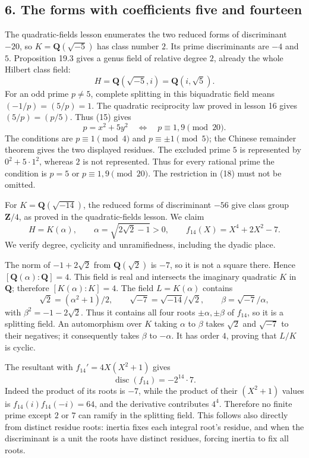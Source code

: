 \documentclass[11pt,a4paper]{article}
\begin{document}
\subsection{6. The forms with coefficients five and
fourteen}\label{the-forms-with-coefficients-five-and-fourteen}

The quadratic-fields lesson enumerates the two reduced forms of
discriminant \(-20\), so \(K=\mathbf Q(\sqrt{-5})\) has class number
\(2\). Its prime discriminants are \(-4\) and \(5\). Proposition 19.3
gives a genus field of relative degree \(2\), already the whole Hilbert
class field: \[
H=\mathbf Q(\sqrt{-5},i)=\mathbf Q(i,\sqrt5).
\tag{17}
\] For an odd prime \(p\ne5\), complete splitting in this biquadratic
field means \((-1/p)=(5/p)=1\). The quadratic reciprocity law proved in
lesson 16 gives \((5/p)=(p/5)\). Thus (15) gives \[
p=x^2+5y^2\quad\Longleftrightarrow\quad p\equiv1,9\pmod{20}.
\tag{18}
\] The conditions are \(p\equiv1\pmod4\) and \(p\equiv\pm1\pmod5\); the
Chinese remainder theorem gives the two displayed residues. The excluded
prime \(5\) is represented by \(0^2+5\cdot1^2\), whereas \(2\) is not
represented. Thus for every rational prime the condition is \(p=5\) or
\(p\equiv1,9\pmod{20}\). The restriction in (18) must not be omitted.

For \(K=\mathbf Q(\sqrt{-14})\), the reduced forms of discriminant
\(-56\) give class group \(\mathbf Z/4\), as proved in the
quadratic-fields lesson. We claim \[
H=K(\alpha),\qquad
\alpha=\sqrt{2\sqrt2-1}>0,
\qquad f_{14}(X)=X^4+2X^2-7.
\tag{19}
\] We verify degree, cyclicity and unramifiedness, including the dyadic
place.

The norm of \(-1+2\sqrt2\) from \(\mathbf Q(\sqrt2)\) is \(-7\), so it
is not a square there. Hence \([\mathbf Q(\alpha):\mathbf Q]=4\). This
field is real and intersects the imaginary quadratic \(K\) in
\(\mathbf Q\); therefore \([K(\alpha):K]=4\). The field \(L=K(\alpha)\)
contains \[
\sqrt2=(\alpha^2+1)/2,\qquad
\sqrt{-7}=\sqrt{-14}/\sqrt2,\qquad
\beta=\sqrt{-7}/\alpha,
\] with \(\beta^2=-1-2\sqrt2\). Thus it contains all four roots
\(\pm\alpha,\pm\beta\) of \(f_{14}\), so it is a splitting field. An
automorphism over \(K\) taking \(\alpha\) to \(\beta\) takes \(\sqrt2\)
and \(\sqrt{-7}\) to their negatives; it consequently takes \(\beta\) to
\(-\alpha\). It has order \(4\), proving that \(L/K\) is cyclic.

The resultant with \(f_{14}'=4X(X^2+1)\) gives \[
\operatorname{disc}(f_{14})=-2^{14}\cdot7.
\tag{20}
\] Indeed the product of its roots is \(-7\), while the product of their
\((X^2+1)\) values is \(f_{14}(i)f_{14}(-i)=64\), and the derivative
contributes \(4^4\). Therefore no finite prime except \(2\) or \(7\) can
ramify in the splitting field. This follows also directly from distinct
residue roots: inertia fixes each integral root's residue, and when the
discriminant is a unit the roots have distinct residues, forcing inertia
to fix all roots.
\end{document}
